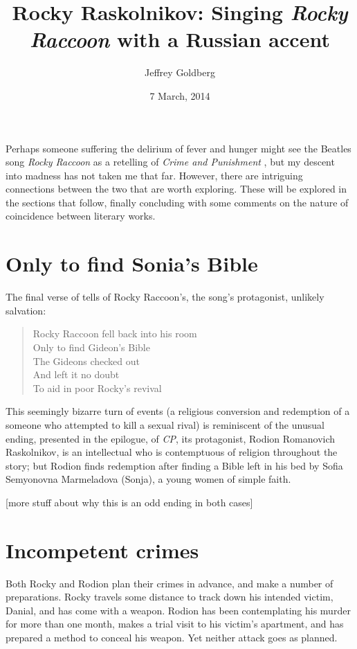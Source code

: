 \documentclass[russian,english,ib]{mlaresearch}
\title{Rocky Raskolnikov: Singing \textit{Rocky Raccoon} with a Russian accent}
\author{Jeffrey Goldberg}
\date{7 March, 2014}
\begin{document}
\makeIBtitle

\frontmatter
\tableofcontents
\mainmatter


Perhaps someone suffering the delirium of fever and hunger might see the
Beatles song \textit{Rocky Raccoon} \autocite{Beatles:RR} as a retelling of
\textit{Crime and Punishment} \autocite{Dostoyevsky:CP}, but my descent into
madness has not taken me that far. However, there are intriguing connections
between the two that are worth exploring. These will be explored in the
sections that follow, finally concluding with some comments on the nature of
coincidence between literary works.

\section{Only to find Sonia's Bible}

The final verse of \autocite{Beatles:RR} tells of Rocky Raccoon's, the song's protagonist, unlikely salvation:

\begin{verse}
Rocky Raccoon fell back into his room\\
Only to find Gideon's Bible\\
The Gideons checked out\\
And left it no doubt\\
To aid in poor Rocky's revival
\end{verse}

This seemingly bizarre turn of events (a religious conversion and redemption
of a someone who attempted to kill a sexual rival) is reminiscent of the
unusual ending, presented in the epilogue, of \textit{CP}, its protagonist,
Rodion Romanovich Raskolnikov, is an intellectual who is contemptuous of
religion throughout the story; but Rodion finds redemption after finding a
Bible left in his bed by Sofia Semyonovna Marmeladova (Sonja), a young women
of simple faith.

[more stuff about why this is an odd ending in both cases]

\section{Incompetent crimes}

Both Rocky and Rodion plan their crimes in advance, and make a number of preparations. Rocky travels some distance to track down his intended victim, Danial, and has come with a weapon. Rodion has been contemplating his murder for more than one month, makes a trial visit to his victim's apartment, and has prepared a method to conceal his weapon. Yet neither attack goes as planned.
\end{document}
